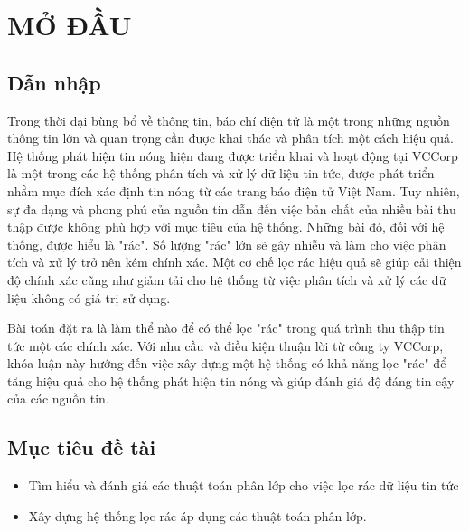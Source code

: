 \chapter{MỞ ĐẦU}
\ifpdf
    \graphicspath{{Chapter1/Chapter1Figs/PNG/}{Chapter1/Chapter1Figs/PDF/}{Chapter1/Chapter1Figs/}}
\else
    \graphicspath{{Chapter1/Chapter1Figs/EPS/}{Chapter1/Chapter1Figs/}}
\fi

\section{Dẫn nhập}
Trong thời đại bùng bổ về thông tin, báo chí điện tử là một trong những nguồn thông tin lớn và quan trọng cần được khai thác và phân tích một cách hiệu quả. Hệ thống phát hiện tin nóng hiện đang được triển khai và hoạt động tại VCCorp là một trong các hệ thống phân tích và xử lý dữ liệu tin tức, được phát triển nhằm mục đích xác định tin nóng từ các trang báo điện tử Việt Nam. Tuy nhiên, sự đa dạng và phong phú của nguồn tin dẫn đến việc bản chất của nhiều bài thu thập được không phù hợp với mục tiêu của hệ thống. Những bài đó, đối với hệ thống, được hiểu là "rác". Số lượng "rác" lớn sẽ gây nhiễu và làm cho việc phân tích và xử lý trở nên kém chính xác. Một cơ chế lọc rác hiệu quả sẽ giúp cải thiện độ chính xác cũng như giảm tải  cho hệ thống từ việc phân tích và xử lý các dữ liệu không có giá trị sử dụng.

Bài toán đặt ra là làm thể nào để có thể lọc "rác" trong quá trình thu thập tin tức một các chính xác. Với nhu cầu và điều kiện thuận lời từ công ty VCCorp, khóa luận này hướng đến việc xây dựng một hệ thống có khả năng lọc "rác" để tăng hiệu quả cho hệ thống phát hiện tin nóng và giúp đánh giá độ đáng tin cậy của các nguồn tin.

\section{Mục tiêu đề tài}
	\begin{itemize}
		\item Tìm hiểu và đánh giá các thuật toán phân lớp cho việc lọc rác dữ liệu tin tức
		\item Xây dựng hệ thống lọc rác áp dụng các thuật toán phân lớp.
	\end{itemize}

